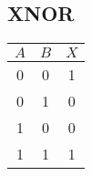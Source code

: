 \subsection{XNOR}

\begin{table}[H]
    \centering
    \begin{tabular}{|c|c|c|}
        \hline
        \cellcolor{gray!40} $A$ & \cellcolor{gray!40} $B$ & \cellcolor{gray!40} $X$ \\
        \hline
        0 & 0 & 1 \\
        \hline
        0 & 1 & 0 \\
        \hline
        1 & 0 & 0 \\
        \hline
        1 & 1 & 1 \\
        \hline
    \end{tabular}
\end{table}
